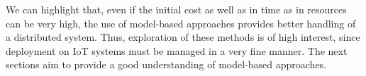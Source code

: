 We can highlight that, even if the initial cost as well as in time as in resources can be very high, the use of model-based approaches provides better handling of a distributed system.
Thus, exploration of these methods is of high interest, since deployment on IoT systems must be managed in a very fine manner.
The next sections aim to provide a good understanding of model-based approaches.




